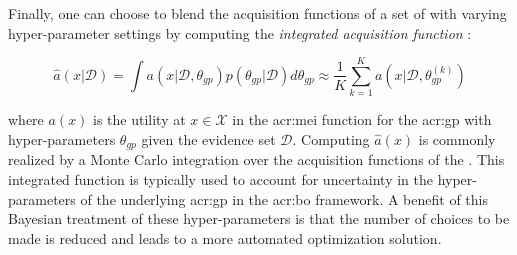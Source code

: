 Finally, one can choose to blend the acquisition functions of a set of  with varying hyper-parameter settings by computing the \textit{integrated acquisition function} \cite{snoek2012practical}:

\begin{equation}
\label{eq:integrated-acq}
\hat{a}(x\vert\mathcal{D}) = \int a(x\vert\mathcal{D}, \theta_{\mathit{gp}})p(\theta_\mathit{gp}\vert\mathcal{D}) d\theta_{\mathit{gp}} \approx \frac{1}{K} \sum_{k=1}^K a(x\vert\mathcal{D}, \theta_{\mathit{gp}}^{(k)})
\end{equation}

\noindent where $a(x)$ is the utility at $x \in \mathcal{X}$ in the \acrshort{acr:mei} function for the \acrshort{acr:gp} with hyper-parameters $\theta_\mathit{gp}$ given the evidence set $\mathcal{D}$.
Computing $\hat{a}(x)$ is commonly realized by a Monte Carlo integration over the acquisition functions of the .
This integrated function is typically used to account for uncertainty in the hyper-parameters of the underlying \acrshort{acr:gp} in the \acrshort{acr:bo} framework.
A benefit of this Bayesian treatment of these hyper-parameters is that the number of choices to be made is reduced and leads to a more automated optimization solution.





